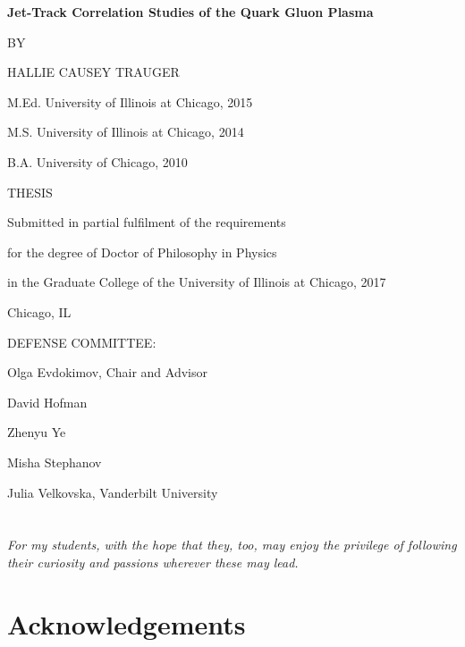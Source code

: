 \documentclass[11pt]{article}
\begin{document}
\begin{center}

\textbf{Jet-Track Correlation Studies of the Quark Gluon Plasma}



\vspace{2.5 in}
BY

HALLIE CAUSEY TRAUGER

M.Ed. University of Illinois at Chicago, 2015

M.S. University of Illinois at Chicago, 2014

B.A. University of Chicago, 2010

\vspace{2.5 in}
THESIS

Submitted in partial fulfilment of the requirements 

for the degree of Doctor of Philosophy in Physics 

in the Graduate College of the University of Illinois at Chicago, 2017

\vspace{0.2 in}
Chicago, IL

\end{center}

\vspace{0.2 in}

DEFENSE COMMITTEE:

\setlength{\parindent}{0.5in} Olga Evdokimov, Chair and Advisor

David Hofman

Zhenyu Ye

Misha Stephanov

Julia Velkovska, Vanderbilt University





\clearpage{}

\setcounter{page}{2}
    
\section*{}
    
\vspace{2.5 in}
    
\textit{For my students, with the hope that they, too, may enjoy the privilege of following their curiosity and passions wherever these may lead.}
\clearpage

\section*{Acknowledgements}
\end{document}

